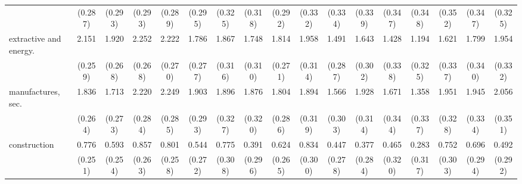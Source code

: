 {\begin{tabular}{l*{16}{c}}
                    &     (0.287)         &     (0.293)         &     (0.293)         &     (0.289)         &     (0.295)         &     (0.325)         &     (0.318)         &     (0.292)         &     (0.332)         &     (0.334)         &     (0.339)         &     (0.347)         &     (0.348)         &     (0.352)         &     (0.347)         &     (0.325)         \\
[1em]
extractive and energy.&       2.151\sym{***}&       1.920\sym{***}&       2.252\sym{***}&       2.222\sym{***}&       1.786\sym{***}&       1.867\sym{***}&       1.748\sym{***}&       1.814\sym{***}&       1.958\sym{***}&       1.491\sym{***}&       1.643\sym{***}&       1.428\sym{***}&       1.194\sym{***}&       1.621\sym{***}&       1.799\sym{***}&       1.954\sym{***}\\
                    &     (0.259)         &     (0.268)         &     (0.268)         &     (0.270)         &     (0.277)         &     (0.316)         &     (0.310)         &     (0.271)         &     (0.314)         &     (0.287)         &     (0.302)         &     (0.338)         &     (0.325)         &     (0.337)         &     (0.340)         &     (0.332)         \\
[1em]
manufactures, sec.  &       1.836\sym{***}&       1.713\sym{***}&       2.220\sym{***}&       2.249\sym{***}&       1.903\sym{***}&       1.896\sym{***}&       1.876\sym{***}&       1.804\sym{***}&       1.894\sym{***}&       1.566\sym{***}&       1.928\sym{***}&       1.671\sym{***}&       1.358\sym{***}&       1.951\sym{***}&       1.945\sym{***}&       2.056\sym{***}\\
                    &     (0.264)         &     (0.273)         &     (0.284)         &     (0.285)         &     (0.293)         &     (0.327)         &     (0.320)         &     (0.286)         &     (0.319)         &     (0.303)         &     (0.314)         &     (0.344)         &     (0.337)         &     (0.328)         &     (0.334)         &     (0.351)         \\
[1em]
construction        &       0.776\sym{**} &       0.593\sym{*}  &       0.857\sym{**} &       0.801\sym{**} &       0.544\sym{*}  &       0.775\sym{*}  &       0.391         &       0.624\sym{*}  &       0.834\sym{**} &       0.447         &       0.377         &       0.465         &       0.283         &       0.752\sym{*}  &       0.696\sym{*}  &       0.492         \\
                    &     (0.251)         &     (0.254)         &     (0.263)         &     (0.258)         &     (0.272)         &     (0.308)         &     (0.296)         &     (0.265)         &     (0.300)         &     (0.278)         &     (0.284)         &     (0.320)         &     (0.317)         &     (0.303)         &     (0.294)         &     (0.292)         \\

\end{tabular}}
